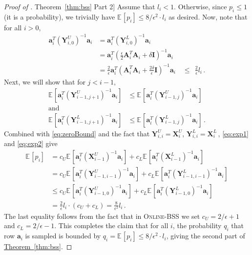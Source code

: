 \documentclass[11pt]{article}
\numberwithin{equation}{section}
\theoremstyle{definition}
\theoremstyle{plain}
\newcommand{\expref}[2]{\hyperref[#2]{#1~\ref{#2}}}
\newcommand{\bv}[1]{\mathbf{#1}}
\newcommand{\expct}[3]{\mathbb{E}_{{#1}_{#2}}\left[#3\right]}
\begin{document}
\begin{proof}[Proof of \expref{Theorem}{thm:bss} Part 2]
Assume that  $l_i < 1$. Otherwise, since $p_i \le 1$ (it is a probability), we trivially have $\expct{}{}{p_i} \le 8/{\epsilon^2}\cdot  l_i$ as desired.  Now, note that for all $i > 0$, %
\begin{align}\label{eq:zeroBound}
\bv{a}_i^T (\bv{Y}^U_{i,0})^{-1} \bv{a}_i &= \bv{a}_i^T (\bv{Y}^L_{i,0})^{-1} \bv{a}_i \nonumber\\
&= \bv{a}_i^T \left ( \frac{\epsilon}{2} \bv{A}_i^T \bv{A}_i + \delta \bv I \right )^{-1} \bv{a}_i \nonumber\\
&= \frac{2}{\epsilon} \bv{a}_i^T \left ( \bv{A}_i^T \bv{A}_i + \frac{2 \delta}{\epsilon} \bv I \right )^{-1} \bv{a}_i
%
 \quad \le \ \ \frac{2}{\epsilon} l_i\,.    %
\end{align}
Next, we will show that for $j < i-1$,
\begin{align}
\expct{}{}{\bv{a}_i^T (\bv{Y}^U_{i-1,j+1})^{-1} \bv{a}_i} &\leq \expct{}{}{\bv{a}_i^T (\bv{Y}^U_{i-1,j})^{-1} \bv{a}_i} \label{eq:exp1}\\
\text{and}\nonumber \\
\expct{}{}{\bv{a}_i^T (\bv{Y}^L_{i-1,j+1})^{-1} \bv{a}_i} &\leq \expct{}{}{\bv{a}_i^T (\bv{Y}^L_{i-1,j})^{-1} \bv{a}_i}\,. \label{eq:exp2}
\end{align}
Combined with \eqref{eq:zeroBound} and the fact that $\bv{Y}^U_{i,i} = \bv{X}^U_i$, $\bv{Y}^L_{i,i} = \bv{X}^L_i$\,, \eqref{eq:exp1} and \eqref{eq:exp2} give
\begin{align*}
\expct{}{}{p_i} &= c_U \expct{}{}{\bv{a}_i^T (\bv{X}^U_{i-1})^{-1} \bv{a}_i} + c_L \expct{}{}{\bv{a}_i^T (\bv{X}^L_{i-1})^{-1} \bv{a}_i} \\
&= c_U \expct{}{}{\bv{a}_i^T (\bv{Y}^U_{i-1,i-1})^{-1} \bv{a}_i} + c_L \expct{}{}{\bv{a}_i^T (\bv{Y}^L_{i-1,i-1})^{-1} \bv{a}_i} \\
&\leq c_U \expct{}{}{\bv{a}_i^T (\bv{Y}^U_{i-1,0})^{-1} \bv{a}_i} + c_L \expct{}{}{\bv{a}_i^T (\bv{Y}^L_{i-1,0})^{-1} \bv{a}_i} \\
&= \frac{2}{\epsilon} l_i  \cdot (c_U + c_L) = \frac{8}{\epsilon^2} l_i\,.
\end{align*}
The last equality follows from the fact that in \textsc{Online-BSS}  we set  $c_U = 2/\epsilon+1$ and $c_L = 2/\epsilon-1$. This completes the claim that for all $i$, the probability $q_i$ that row $\bv{a}_i$ is sampled is bounded by $q_i = \expct{}{}{p_i} \le 8/\epsilon^2 \cdot l_i$, giving the second part of \expref{Theorem}{thm:bss}.


\end{proof}
\end{document}
